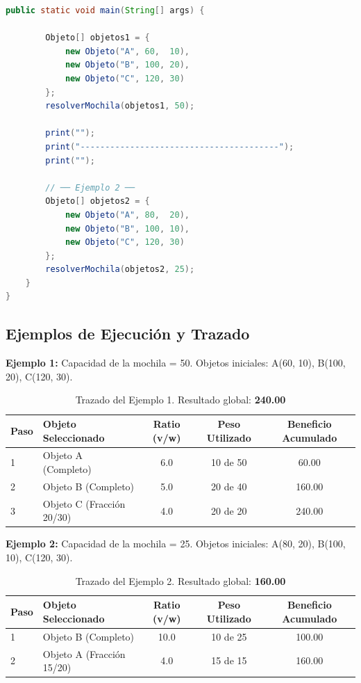\documentclass[11pt, a4paper]{article}
\begin{document}
\begin{lstlisting}[language=Java, caption=Implementación algorítmica de la Mochila Fraccional]
    public static void main(String[] args) {

        Objeto[] objetos1 = {
            new Objeto("A", 60,  10),
            new Objeto("B", 100, 20),
            new Objeto("C", 120, 30)
        };
        resolverMochila(objetos1, 50);

        print("");
        print("----------------------------------------");
        print("");

        // ── Ejemplo 2 ──
        Objeto[] objetos2 = {
            new Objeto("A", 80,  20),
            new Objeto("B", 100, 10),
            new Objeto("C", 120, 30)
        };
        resolverMochila(objetos2, 25);
    }
}
\end{lstlisting}

\subsection{Ejemplos de Ejecución y Trazado}

\textbf{Ejemplo 1:} Capacidad de la mochila = 50. Objetos iniciales: A(60, 10), B(100, 20), C(120, 30).
\begin{table}[htbp]
\centering
\begin{tabular}{llccc}
\toprule
\textbf{Paso} & \textbf{Objeto Seleccionado} & \textbf{Ratio (v/w)} & \textbf{Peso Utilizado} & \textbf{Beneficio Acumulado} \\
\midrule
1 & Objeto A (Completo) & 6.0 & 10 de 50 & 60.00 \\
2 & Objeto B (Completo) & 5.0 & 20 de 40 & 160.00 \\
3 & Objeto C (Fracción 20/30) & 4.0 & 20 de 20 & 240.00 \\
\bottomrule
\end{tabular}
\caption{Trazado del Ejemplo 1. Resultado global: \textbf{240.00}}
\end{table}

\textbf{Ejemplo 2:} Capacidad de la mochila = 25. Objetos iniciales: A(80, 20), B(100, 10), C(120, 30).
\begin{table}[htbp]
\centering
\begin{tabular}{llccc}
\toprule
\textbf{Paso} & \textbf{Objeto Seleccionado} & \textbf{Ratio (v/w)} & \textbf{Peso Utilizado} & \textbf{Beneficio Acumulado} \\
\midrule
1 & Objeto B (Completo) & 10.0 & 10 de 25 & 100.00 \\
2 & Objeto A (Fracción 15/20) & 4.0 & 15 de 15 & 160.00 \\
\bottomrule
\end{tabular}
\caption{Trazado del Ejemplo 2. Resultado global: \textbf{160.00}}
\end{table}
\end{document}
